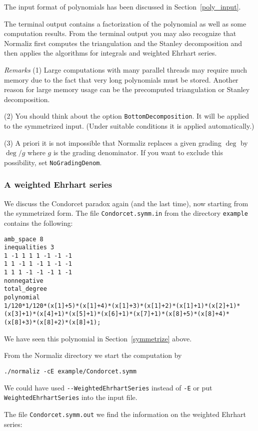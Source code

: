 \documentclass[12pt,a4paper]{scrartcl}
\theoremstyle{definition}
\def\ttt{\texttt}
\begin{document}
The input format of polynomials has been discussed in Section~\ref{poly_input}.

The terminal output contains a factorization of the polynomial as well as some computation results. From the terminal output you may also recognize that Normaliz first computes the triangulation and the Stanley decomposition and then applies the algorithms for integrals and weighted Ehrhart series.

\emph{Remarks} \enspace (1) Large computations with many parallel threads may require much memory due to the fact that very long polynomials must be stored. Another reason for large memory usage can be the precomputed triangulation or Stanley decomposition.

(2) You should think about the option \verb|BottomDecomposition|. It will be applied to the symmetrized input. (Under suitable conditions it is applied automatically.)

(3) A priori it is not impossible that Normaliz replaces a given grading $\deg$ by $\deg/g$ where $g$ is the grading denominator. If you want to exclude this possibility, set \verb|NoGradingDenom|.


\subsubsection{A weighted Ehrhart series}

We discuss the Condorcet paradox again (and the last time), now starting from the symmetrized form. The file \ttt{Condorcet.symm.in} from the directory
\ttt{example} contains the following:

\begin{Verbatim}
amb_space 8
inequalities 3
1 -1 1 1 1 -1 -1 -1
1 1 -1 1 -1 1 -1 -1
1 1 1 -1 -1 -1 1 -1
nonnegative
total_degree
polynomial
1/120*1/120*(x[1]+5)*(x[1]+4)*(x[1]+3)*(x[1]+2)*(x[1]+1)*(x[2]+1)*
(x[3]+1)*(x[4]+1)*(x[5]+1)*(x[6]+1)*(x[7]+1)*(x[8]+5)*(x[8]+4)*
(x[8]+3)*(x[8]+2)*(x[8]+1);
\end{Verbatim}
We have seen this polynomial in Section~\ref{symmetrize} above.


From the Normaliz directory we start the computation by
\begin{Verbatim}
./normaliz -cE example/Condorcet.symm
\end{Verbatim}
We could have used \verb|--WeightedEhrhartSeries| instead of \verb|-E| or put \verb|WeightedEhrhartSeries| into the input file.

The file \ttt{Condorcet.symm.out} we find the information on the weighted Ehrhart series:
\end{document}
